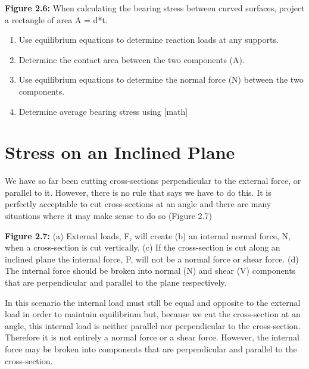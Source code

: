 \documentclass[
  letterpaper,
  DIV=11,
  numbers=noendperiod]{scrreprt}
\begin{document}
\textbf{Figure 2.6:} When calculating the bearing stress between curved
surfaces, project a rectangle of area A = d*t.

\begin{tcolorbox}[enhanced jigsaw, colback=white, colframe=quarto-callout-note-color-frame, leftrule=.75mm, opacitybacktitle=0.6, colbacktitle=quarto-callout-note-color!10!white, arc=.35mm, bottomrule=.15mm, breakable, title={Step-by-step:}, left=2mm, titlerule=0mm, toptitle=1mm, toprule=.15mm, opacityback=0, rightrule=.15mm, coltitle=black, bottomtitle=1mm]

\begin{enumerate}
\def\labelenumi{\arabic{enumi}.}
\item
  Use equilibrium equations to determine reaction loads at any supports.
\item
  Determine the contact area between the two components (A).
\item
  Use equilibrium equations to determine the normal force (N) between
  the two components.
\item
  Determine average bearing stress using {[}math{]}
\end{enumerate}

\end{tcolorbox}

\section{Stress on an Inclined Plane}\label{stress-on-an-inclined-plane}

We have so far been cutting cross-sections perpendicular to the external
force, or parallel to it. However, there is no rule that says we have to
do this. It is perfectly acceptable to cut cross-sections at an angle
and there are many situations where it may make sense to do so (Figure
2.7)

\textbf{Figure 2.7:} (a) External loads, F, will create (b) an internal
normal force, N, when a cross-section is cut vertically. (c) If the
cross-section is cut along an inclined plane the internal force, P, will
not be a normal force or shear force. (d) The internal force should be
broken into normal (N) and shear (V) components that are perpendicular
and parallel to the plane respectively.

In this scenario the internal load must still be equal and opposite to
the external load in order to maintain equilibrium but, because we cut
the cross-section at an angle, this internal load is neither parallel
nor perpendicular to the cross-section. Therefore it is not entirely a
normal force or a shear force. However, the internal force may be broken
into components that are perpendicular and parallel to the
cross-section.
\end{document}
